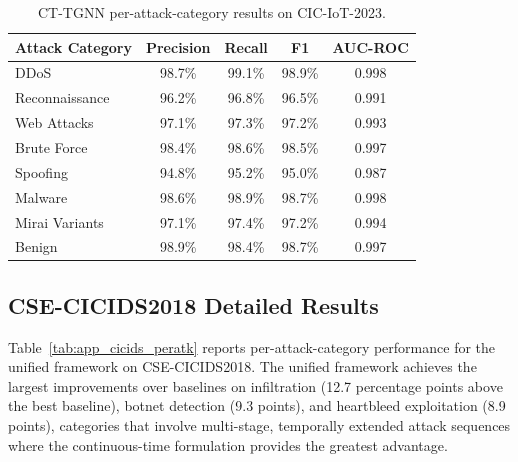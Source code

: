 \begin{table}[htbp]
\centering
\caption{CT-TGNN per-attack-category results on CIC-IoT-2023.}
\label{tab:app_iot_peratk}
\begin{tabular}{lcccc}
\toprule
Attack Category & Precision & Recall & F1 & AUC-ROC \\
\midrule
DDoS             & 98.7\% & 99.1\% & 98.9\% & 0.998 \\
Reconnaissance   & 96.2\% & 96.8\% & 96.5\% & 0.991 \\
Web Attacks      & 97.1\% & 97.3\% & 97.2\% & 0.993 \\
Brute Force      & 98.4\% & 98.6\% & 98.5\% & 0.997 \\
Spoofing         & 94.8\% & 95.2\% & 95.0\% & 0.987 \\
Malware          & 98.6\% & 98.9\% & 98.7\% & 0.998 \\
Mirai Variants   & 97.1\% & 97.4\% & 97.2\% & 0.994 \\
\midrule
Benign           & 98.9\% & 98.4\% & 98.7\% & 0.997 \\
\bottomrule
\end{tabular}
\end{table}


\subsection{CSE-CICIDS2018 Detailed Results}
\label{app:cicids2018_detail}

Table~\ref{tab:app_cicids_peratk} reports per-attack-category performance for the unified framework on CSE-CICIDS2018. The unified framework achieves the largest improvements over baselines on infiltration (12.7 percentage points above the best baseline), botnet detection (9.3 points), and heartbleed exploitation (8.9 points), categories that involve multi-stage, temporally extended attack sequences where the continuous-time formulation provides the greatest advantage.

